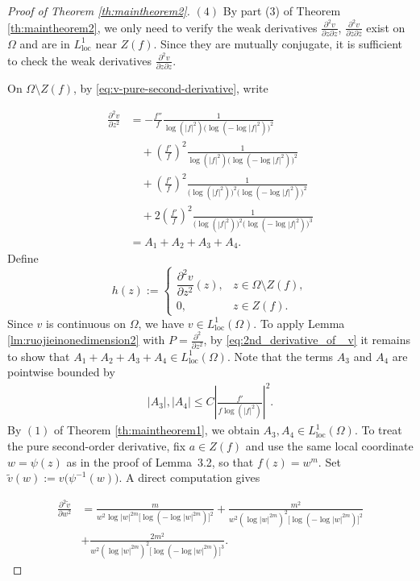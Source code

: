 \documentclass[12pt,twoside]{amsart}
\numberwithin{equation}{section}
\numberwithin{definition}{section} %
\begin{document}
\begin{proof}[Proof of Theorem \ref{th:maintheorem2}]
$(4)$  By part \textup{(3)} of  Theorem \ref{th:maintheorem2}, we only need to verify the weak derivatives $\frac{\partial ^2v}{ \partial z \partial z} $,  $\frac{\partial ^2 v}{ \partial \overline{z} \partial \overline{z}} $ exist  on $\Omega$  and are in $L^1_{\mathrm{loc}}$ near $Z(f)$.  Since they are mutually conjugate,  it is sufficient to check the weak derivatives  $\frac{\partial ^2 v}{ \partial z \partial z} $.

On \(\Omega\setminus Z(f)\), by \eqref{eq:v-pure-second-derivative}, write

\begin{equation}
\begin{split}
\frac{\partial^2 v}{\partial z^2}
&= - \frac{f''}{f}\frac{1}{\log(|f|^2)\bigl(\log(-\log|f|^2)\bigr)^2} \\
&\quad + \left( \frac{f'}{f}\right)^2
   \frac{1}{\log(|f|^2)\bigl(\log(-\log|f|^2)\bigr)^2} \\
&\quad + \left( \frac{f'}{f}\right)^2
   \frac{1}{\bigl(\log(|f|^2)\bigr)^2 \bigl(\log(-\log|f|^2)\bigr)^2} \\
&\quad + 2 \left( \frac{f'}{f}\right)^2
   \frac{1}{\bigl(\log(|f|^2)\bigr)^2 \bigl(\log(-\log|f|^2)\bigr)^3} \\
&= A_1 + A_2 + A_3 + A_4.
\end{split}
\label{eq:2nd_derivative_of _v}
\end{equation}
Define 
\[
h(z):=
\begin{cases}
\dfrac{\partial^2v}{\partial z^2}(z),
& z\in\Omega\setminus Z(f),\\[8pt]
0,
& z\in Z(f).
\end{cases}
\]
Since \(v\) is continuous on \(\Omega\), we have
$
v\in L_{\mathrm{loc}}^1(\Omega).
$
To apply Lemma \ref{lm:ruojieinonedimension2} with \(P=\frac{\partial^2 }{\partial z^2} \), by \eqref{eq:2nd_derivative_of _v} it remains to show that
$
A_1+A_2+A_3+A_4\in L_{\mathrm{loc}}^1(\Omega).
$
Note that the terms $A_3$ and $A_4$ are pointwise bounded by
\begin{eqnarray*}
|A_3|, |A_4| \leq C \left| \frac{f' }{f \log(|f|^2)}\right|^2.
\end{eqnarray*}
By $(1)$ of Theorem \ref{th:maintheorem1}, we obtain $A_3, A_4\in L^1_{\mathrm{loc}}(\Omega)$. To treat the pure second-order derivative, fix $a\in Z(f)$ and use the same
local coordinate $w=\psi(z)$ as in the proof of Lemma~3.2, so that
$f(z)=w^m$. Set
$\widetilde v(w):=v\bigl(\psi^{-1}(w)\bigr).$
A direct computation gives

\begin{align*}
\frac{\partial^2 \widetilde v}{\partial w^2}
&= 
\frac{m}
{w^2\log |w|^{2m}
 \bigl[\log(-\log |w|^{2m})\bigr]^2}
+
\frac{m^2}
{w^2(\log |w|^{2m})^2
 \bigl[\log(-\log |w|^{2m})\bigr]^2} \\
&+
\frac{2m^2}
{w^2(\log |w|^{2m})^2
 \bigl[\log(-\log |w|^{2m})\bigr]^3}.
\end{align*}


\end{proof}
\end{document}
